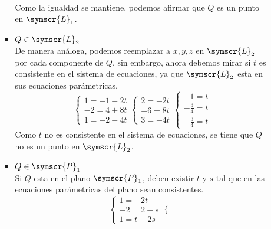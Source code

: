 \documentclass{article}
\def\fancyL{\symscr{L}}
\def\fancyP{\symscr{P}}
\begin{document}
\begin{enumerate}
\begin{itemize}
\begin{itemize}
\[\begin{aligned}
                        \end{aligned}
                    \]
                    Como la igualdad se mantiene, podemos afirmar que \(Q\) es un punto en \(\fancyL_1\).
                \item \(Q \in \fancyL_2\) \\
                    De manera análoga, podemos reemplazar a \(x, y, z\) en \(\fancyL_2\) por cada componente de \(Q\), sin embargo, ahora debemos mirar si 
                    \(t\) es consistente en el sistema de ecuaciones, ya que \(\fancyL_2\) esta en sus ecuaciones parámetricas.
                    \[
                        \begin{cases}
                            1 = -1 -2t \\
                            -2 = 4 +8t \\ 
                            1 = -2 -4t
                        \end{cases}
                        \begin{cases}
                            2 = -2t \\
                            -6 = 8t \\ 
                            3 = -4t
                        \end{cases}
                        \begin{cases}
                            -1 = t \\
                            -\frac{3}{4} = t \\ 
                            -\frac{3}{4} = t
                        \end{cases}
                    \]
                    Como \(t\) no es consistente en el sistema de ecuaciones, se tiene que \(Q\) no es un punto en \(\fancyL_2\).
                \item \(Q \in \fancyP_1\) \\
                    Si \(Q\) esta en el plano \(\fancyP_1\), deben existir \(t\) y \(s\) tal que en las ecuaciones parámetricas del plano sean consistentes.
                    \[
                        \begin{cases}
                            1 = -2t \\
                            -2 = 2 - s \\
                            1 = t - 2s
                        \end{cases}
                        \begin{cases}

\end{cases}\]
\end{itemize}
\end{itemize}
\end{enumerate}
\end{document}
